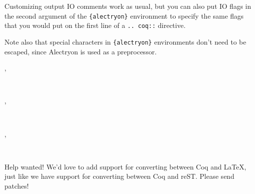 \documentclass[10pt]{beamer}
\begin{document}
\begin{frame}[fragile]{Customizing output}
  IO comments work as usual, but you can also put IO flags in the second argument of the \verb|{alectryon}| environment to specify the same flags that you would put on the first line of a \verb|.. coq::| directive.

  Note also that special characters in \verb|{alectryon}| environments don't need to be escaped, since Alectryon is used as a preprocessor.

\begin{alectryon}
  \sep
  \begin{sentence}
    \begin{input}
      ~
    \end{input}
  \end{sentence}
\end{alectryon}

\begin{alectryon}
  \sep
  \begin{sentence}
    \begin{input}
      ~~~~
    \end{input}
    \sep
    \begin{output}
      \begin{messages}
        \begin{message}
          ~~~~~~\nl
          ~~~~~~~~\nl
        \end{message}
      \end{messages}
    \end{output}
  \end{sentence}
\end{alectryon}
\end{frame}

\begin{frame}{Help wanted!}
  We'd love to add support for converting between Coq and LaTeX, just like we have support for converting between Coq and reST.  Please send patches!
\end{frame}
\end{document}
